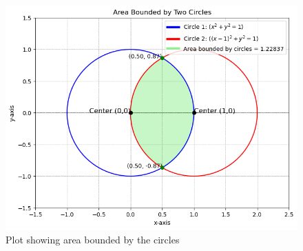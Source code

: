 \documentclass[journal]{IEEEtran}
\begin{document}
 \begin{figure}[h!]
   \centering
   \includegraphics[width=0.7\linewidth]{figs/figure1.png}
   \caption{Plot showing area bounded by the circles}
   \label{stemplot}
\end{figure}
\end{document}
